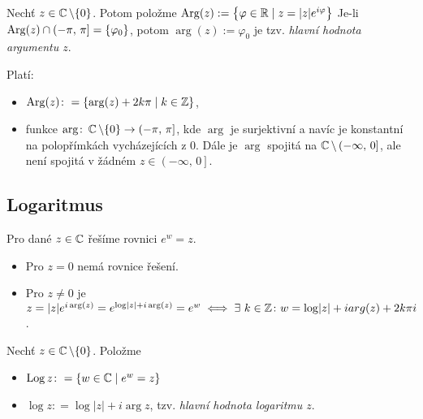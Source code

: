     \begin{notation}
          Nechť $z\in\operatorname{\mathbb{C}}  \setminus\{0\}$. Potom položme $\operatorname*{Arg}(z):=\left\{\varphi\in\operatorname{\mathbb{R}} \mid z=\lvert z \rvert e^{i\varphi}\right\}$ Je-li $\operatorname*{Arg}(z) \cap  (-\pi,\,\pi]=\{\varphi_0\}$, potom $\arg(z):=\varphi_0$ je tzv. \emph{hlavní hodnota argumentu $z$}. %
    \end{notation}
     
         Platí: 
        \begin{itemize}
            \item $\operatorname*{Arg}(z)\colon = \{\arg(z)+2k\pi\mid k\in\operatorname{\mathbb{Z}} \}$,
            \item funkce $\arg\colon \operatorname{\mathbb{C}}\setminus\{0\} \to \left (-\pi,\,\pi\right ]$, kde $\arg$ je surjektivní a navíc je konstantní na polopřímkách vycházejících z $0$. Dále je $\arg$ spojitá na $\operatorname{\mathbb{C}}\setminus\left (-\infty,\,0\right ]$, ale není spojitá v žádném $z\in \left (-\infty,\,0\right ]$.
        \end{itemize}



\subsection{Logaritmus}
Pro dané $z\in\operatorname{\mathbb{C}}  $ řešíme rovnici $e^w=z$. 
\begin{itemize}
    \item Pro $z=0$ nemá rovnice řešení. \item Pro $z\neq 0$ je $z=\lvert z \rvert e^{i  \arg(z)}=e^{\log\lvert z \rvert+i   \arg(z)}=e^w\iff\exists\ k \in\operatorname{\mathbb{Z}} \colon w=\log \lvert z \rvert +i arg(z)+2k\pi i$.
    \end{itemize}

\newpage
\begin{definition}
Nechť $z\in\operatorname{\mathbb{C}}  \setminus\{0\}$. Položme 
\begin{itemize}
    \item $\operatorname*{Log} z\colon=\{w\in\operatorname{\mathbb{C}}  \mid e^w=z\}$
    \item $\log z\colon= \log\lvert z \rvert + i \arg z$,  tzv. \emph{hlavní hodnota logaritmu $z$}.
\end{itemize}
\end{definition}

